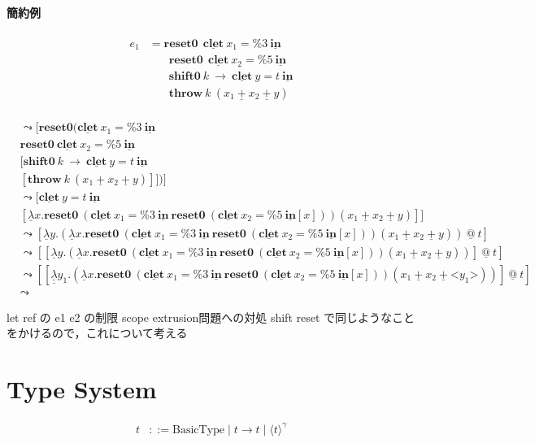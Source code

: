 \documentclass[10pt,a4j]{jarticle}
\makeatletter
\newcommand\Resetz{\textbf{reset0}}
\newcommand\Shiftz{\textbf{shift0}}
\newcommand\Throw{\textbf{throw}}
\newcommand\cfun[2]{\underline{\lambda}{#1}.{#2}}
\newcommand\ccfun[2]{\underline{\underline{\lambda}}{#1}.{#2}}
\newcommand\cPlus{\underline{\textbf{+}}}
\newcommand\cLet{\underline{\textbf{clet}}}
\newcommand\cIn{\underline{\textbf{in}}}
\newcommand\csp[1]{\texttt{\%}{#1}}
\newcommand\code[1]{\texttt{<}{#1}\texttt{>}}
\newcommand\codeT[2]{\langle{#1}\rangle^{#2}}
\newcommand\lto{\leadsto}
\newcommand\cat{~\underline{@}~}
\theoremstyle{break}
\makeatother
\begin{document}
\paragraph{簡約例}

\begin{align*}
  e_1 & = \Resetz ~~\cLet~x_1=\csp{3}~\cIn \\
      & \phantom{=}~~ \Resetz ~~\cLet~x_2=\csp{5}~\cIn \\
      & \phantom{=}~~ \Shiftz~k~\to~\cLet~y=t~\cIn \\
      & \phantom{=}~~ \Throw~ k~ (x_1~\cPlus~x_2~\cPlus~y) \\
\end{align*}

\begin{align*}
  [ e_1 ] &\lto [ \Resetz (\cLet~x_1=\csp{3}~\cIn \\
          &\Resetz~ \cLet~x_2=\csp{5}~\cIn \\
          &[ \Shiftz~ k~ \to~ \cLet~ y=t~ \cIn \\
          &[ \Throw~ k~(x_1~\cPlus~x_2~\cPlus~y) ] ] ) ] \\
          &\lto [ \cLet~ y=t~ \cIn \\
          &[ \cfun{x}{\Resetz~ (\cLet~x_1=\csp{3}~ \cIn~ \Resetz~ (\cLet~ x_2=\csp{5}~ \cIn [x]))} (x_1~\cPlus~x_2~\cPlus~y) ]] \\
          &\lto [ \cfun{y}{(\cfun{x}{\Resetz~ (\cLet~x_1=\csp{3}~ \cIn~ \Resetz~ (\cLet~ x_2=\csp{5}~ \cIn [x]))} (x_1~\cPlus~x_2~\cPlus~y))} \cat t ] \\
          &\lto [[\cfun{y}{(\cfun{x}{\Resetz~ (\cLet~x_1=\csp{3}~ \cIn~ \Resetz~ (\cLet~ x_2=\csp{5}~ \cIn [x]))} (x_1~\cPlus~x_2~\cPlus~y))}] \cat t] \\
          &\lto [[\ccfun{y_1}{(\cfun{x}{\Resetz~ (\cLet~x_1=\csp{3}~ \cIn~ \Resetz~ (\cLet~ x_2=\csp{5}~ \cIn [x]))} (x_1~\cPlus~x_2~\cPlus~ \code{y_1}))}] \cat t] \\
          &\lto
\end{align*}

let ref の e1 e2 の制限 scope extrusion問題への対処
shift reset で同じようなことをかけるので，これについて考える


\section{Type System}

\begin{align*}
  t & ::= \textrm{BasicType} \mid t \to t \mid \codeT{t}{\gamma}
\end{align*}
\end{document}
